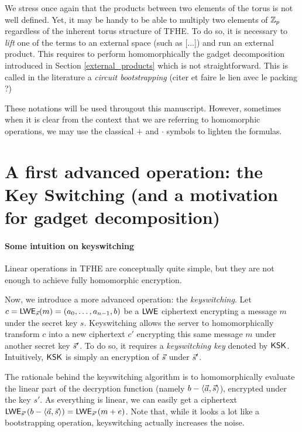 We stress once again that the products between two elements of the torus is not well defined. Yet, it may be handy to be able to multiply two elements of $\mathbb{Z}_p$ regardless of the inherent torus structure of TFHE. To do so, it is necessary to \textit{lift} one of the terms to an external space (such as [...]) and run an external product. This requires to perform homomorphically the gadget decomposition introduced in Section \ref{external_products} which is not straightforward. This is called in the literature a \textit{circuit bootstrapping} (citer et faire le lien avec le packing ?)


These notations will be used througout this manuscript. However, sometimes when it is clear from the context that we are referring to homomorphic operations, we may use the classical $+$ and $\cdot$ symbols to lighten the formulas.


\section{A first advanced operation: the Key Switching (and a motivation for gadget decomposition)}




\paragraph{Some intuition on keyswitching}
Linear operations in TFHE are conceptually quite simple, but they are not enough to achieve fully homomorphic encryption.

Now, we introduce a more advanced operation: the \textit{keyswitching}. Let $c = \textsf{LWE}_{\vec s}(m) = (a_0, \dots, a_{n-1}, b)$ be a $\textsf{LWE}$ ciphertext encrypting a message $m$ under the secret key $s$. Keyswitching allows the server to homomorphically transform $c$ into a new ciphertext $c'$ encrypting this same message $m$ under another secret key $\vec s'$. To do so, it requires a \textit{keyswitching key} denoted by $\textsf{KSK}$. Intuitively, $\textsf{KSK}$ is simply an encryption of $\vec s$ under $\vec s'$. 

The rationale behind the keyswitching algorithm is to homomorphically evaluate the linear part of the decryption function (namely $b - \langle \vec a, \vec s \rangle$), encrypted under the key $s'$. As everything is linear, we can easily get a ciphertext $\textsf{LWE}_{\vec s'}(b - \langle \vec a, \vec s \rangle) = \textsf{LWE}_{\vec s'}(m + e)$. Note that, while it looks a lot like a bootstrapping operation, keyswitching actually increases the noise.  


